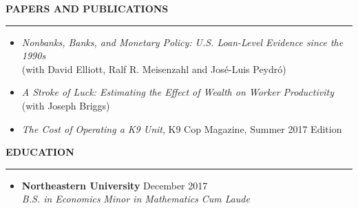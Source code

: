 \documentclass[10pt]{article} %
\begin{document}
\smallskip
\MakeUppercase{\bf Papers and Publications}
\smallskip
\hrule
	\begin{itemize}  [topsep=3pt,itemsep= 2pt,partopsep=2pt, parsep= 2pt, leftmargin = *]
		\item[] \emph{Nonbanks, Banks, and Monetary Policy: U.S. Loan-Level Evidence since the 1990s} \\ (with David Elliott, Ralf R. Meisenzahl and Jos\'e-Luis Peydr\'o)
		\item[] \emph{A Stroke of Luck: Estimating the Effect of Wealth on Worker Productivity} \\ (with Joseph Briggs)
		\item[] \emph{The Cost of Operating a K9 Unit}, K9 Cop Magazine, Summer 2017 Edition
	\end{itemize}

\MakeUppercase{\bf Education}
\smallskip
\hrule
\begin{itemize}[topsep=3pt,itemsep= 2pt,partopsep=0pt, parsep= 0pt, leftmargin = *]
	\item[] {\bf Northeastern University} \hfill {December 2017}\\
    \emph{B.S. in Economics} {\textbullet} \emph{Minor in Mathematics} \hfill {\emph{Cum Laude}} 
\end{itemize}


\end{document}
